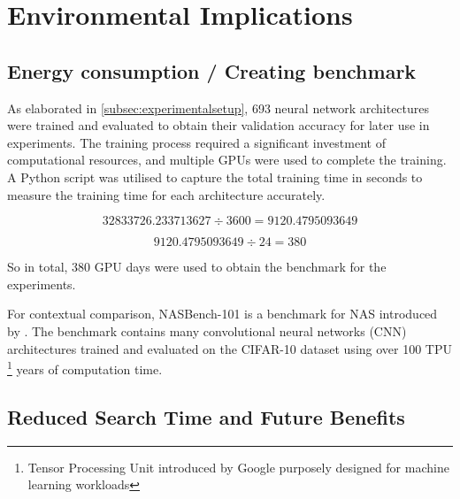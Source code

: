\section{Environmental Implications}
\subsection{Energy consumption / Creating benchmark}

As elaborated in \cref{subsec:experimentalsetup}, 693 neural network architectures were trained and evaluated to obtain their validation accuracy for later use in experiments. The training process required a significant investment of computational resources, and multiple GPUs were used to complete the training. A Python script was utilised to capture the total training time in seconds to measure the training time for each architecture accurately.

\begin{equation*} 32833726.233713627 \div 3600 = 9120.4795093649 \end{equation*}

\begin{equation*}
    9120.4795093649 \div 24 = 380
\end{equation*}

So in total, 380 GPU days were used to obtain the benchmark for the experiments. 

For contextual comparison, NASBench-101 is a benchmark for NAS introduced by \autocite{ying2019bench}. The benchmark contains many convolutional neural networks (CNN) architectures trained and evaluated on the CIFAR-10 dataset using over 100 TPU \footnote{Tensor Processing Unit introduced by Google purposely designed for machine learning workloads} years of computation time. 

\subsection{Reduced Search Time and Future Benefits}

\begin{comment}
\begin{itemize}
    \item Discuss how this approach might reduce the time spent on neural architecture search
    \item Address the broader implications of such reductions, such as enabling more efficient research, reducing the overall environmental impact of the field, and making neural architecture search more accessible to researchers with limited resources.
\end{itemize}
\end{comment}

